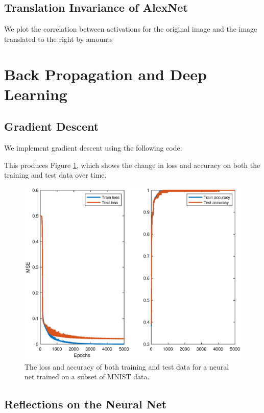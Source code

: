 \documentclass[11pt, oneside]{article}
\begin{document}
\subsection{Translation Invariance of AlexNet}

We plot the correlation between activations for the original image and the image translated to the right by amounts 

\section{Back Propagation and Deep Learning}

\subsection{Gradient Descent}

We implement gradient descent using the following code:


This produces Figure \ref{fig:netMetrics}, which shows the change in loss and accuracy on both the training and test data over time.

\begin{figure}[ht!]
\includegraphics[width=1\textwidth]{netMetrics.eps}
\caption{The loss and accuracy of both training and test data for a neural net trained on a subset of MNIST data.}
\label{fig:netMetrics}
\end{figure}

\subsection{Reflections on the Neural Net}
\end{document}
